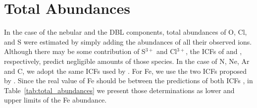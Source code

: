 \documentclass[twocolumn]{aastex63}
\newcommand{\eduardo}[1]{{\color{teal}E: #1}}
\newcounter{ionstage}
\renewcommand{\ion}[2]{\setcounter{ionstage}{#2}%
  \ensuremath{\mathrm{#1\,\scriptstyle\Roman{ionstage}}}}
\newcommand\oiii{[\ion{O}{3}]}
\newcommand\Mach{\ensuremath{\mathcal{M}}}
\begin{document}



\section{Total Abundances}
\label{sec:total_abun}


In the case of the nebular and the DBL components, total abundances of O, Cl, and S were estimated by simply adding the abundances of all their observed ions. Although there may be some contribution of S$^{3+}$ and Cl$^{3+}$, the ICFs of \citet{stasinska78} and \citet{Esteban15}, respectively, predict negligible amounts of those species. In the case of N, Ne, Ar and C, we adopt the same ICFs used by \citet{arellanocorodova20}. For Fe, we use the two ICFs proposed by  \citet{rodriguez05}. Since the real value of Fe should be between the predictions of both ICFs \citep{rodriguez05}, in Table~\ref{tab:total_abundances} we present those determinations as lower and upper limits of the Fe abundance. 
\end{document}
